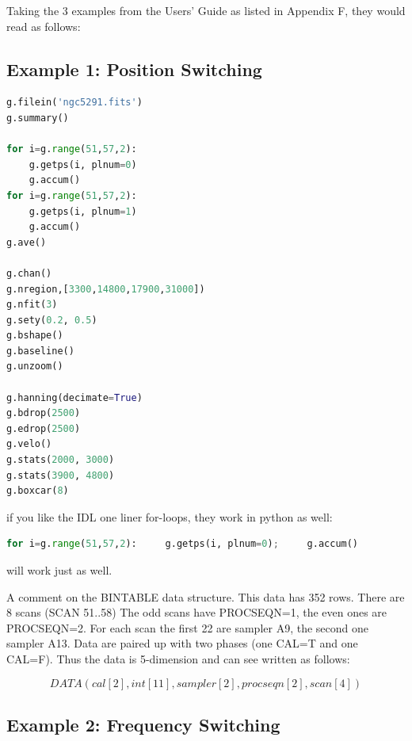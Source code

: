 \documentclass[12pt,a4paper]{article}
\begin{document}
\noindent    
Taking the 3 examples from the Users' Guide as listed in Appendix F,
they would read as follows:

\subsection{Example 1:   Position Switching}

\begin{lstlisting}[language=python]
g.filein('ngc5291.fits')
g.summary()

for i=g.range(51,57,2):
    g.getps(i, plnum=0)
    g.accum()
for i=g.range(51,57,2):
    g.getps(i, plnum=1)
    g.accum()
g.ave()

g.chan()
g.nregion,[3300,14800,17900,31000])
g.nfit(3)
g.sety(0.2, 0.5)
g.bshape()
g.baseline()
g.unzoom()

g.hanning(decimate=True)
g.bdrop(2500)
g.edrop(2500)
g.velo()
g.stats(2000, 3000)
g.stats(3900, 4800)
g.boxcar(8)
\end{lstlisting}


if you like the IDL one liner for-loops, they work in python as well:

\begin{lstlisting}[language=python]
  for i=g.range(51,57,2):     g.getps(i, plnum=0);     g.accum()
\end{lstlisting}

will work just as well.

A comment on the BINTABLE data structure. This data has 352 rows. There are 8 scans (SCAN 51..58) The odd scans
have PROCSEQN=1, the even ones are PROCSEQN=2.  For each scan the first 22 are sampler A9, the second one sampler A13.
Data are paired up with two phases (one CAL=T and one CAL=F).   Thus the data is 5-dimension and can see written
as follows:

$$
DATA(cal[2],int[11],sampler[2],procseqn[2],scan[4])
$$

\subsection{Example 2: Frequency Switching}
\end{document}
